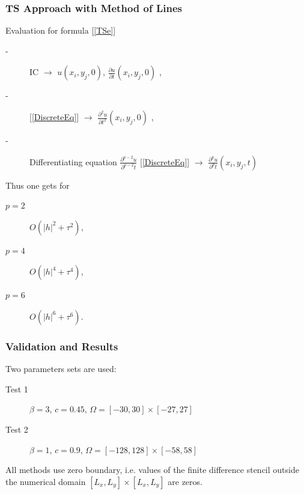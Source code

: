 \documentclass{beamer}
\begin{document}

\begin{frame}
\frametitle{TS Approach with Method of Lines}
Evaluation for formula [\ref{TSe}]
\begin{description}
 \item[-] IC $\rightarrow$ $u(x_i, y_j, 0)$, $\frac{ \partial u }{ \partial t }(x_i, y_j, 0)$ ,
 \item[-] [\ref{DiscreteEq}] $\rightarrow$ $\frac{ \partial^2 u }{ \partial t^2 }(x_i, y_j, 0)$ ,
 \item[-] Differentiating equation $\frac{ \partial^{p-2} u }{ \partial^{p-2} t }$ [\ref{DiscreteEq}] $\rightarrow$  $\frac{ \partial^p u }{ \partial^p t }(x_i, y_j, t)$
\end{description}

Thus one gets for
\begin{description}
 \item[$p=2$] $O(|h|^2 + \tau^2)$,
 \item[$p=4$] $O(|h|^4 + \tau^4)$,
 \item[$p=6$] $O(|h|^6 + \tau^6)$.
\end{description}

\end{frame}


\begin{frame}
\frametitle{Validation and Results}
Two parameters sets are used:
\begin{description}
 \item[Test 1] $\beta = 3$, $c = 0.45$, $\Omega = [-30, 30] \times [-27, 27]$
 \item[Test 2] $\beta = 1$, $c = 0.9$, $\Omega = [-128, 128] \times [-58, 58]$
\end{description}

All methods use zero boundary, i.e. values of the finite difference stencil outside the numerical domain $[L_x, L_y] \times [L_x, L_y]$ are zeros.
\end{frame}

\end{document}
